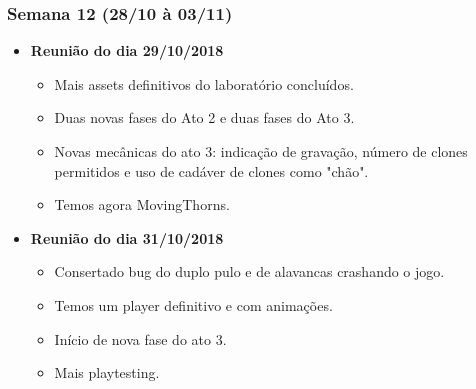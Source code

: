 \documentclass[a4paper, 11pt]{article}
\begin{document}
\subsubsection{Semana 12 (28/10 à 03/11)}
	\begin{itemize} 
		\item \textbf{Reunião do dia 29/10/2018}

		\begin{itemize}

    		\item Mais assets definitivos do laboratório concluídos.
    		\item Duas novas fases do Ato 2 e duas fases do Ato 3.
    		\item Novas mecânicas do ato 3: indicação de gravação, número de clones permitidos e uso de cadáver de clones como "chão".
    		\item Temos agora MovingThorns.

   		\end{itemize}

		\item \textbf{Reunião do dia 31/10/2018}

		\begin{itemize}

    		\item Consertado bug do duplo pulo e de alavancas crashando o jogo.
    		\item Temos um player definitivo e com animações.
    		\item Início de nova fase do ato 3.
    		\item Mais playtesting.

		\end{itemize}

	\end{itemize}
\end{document}
